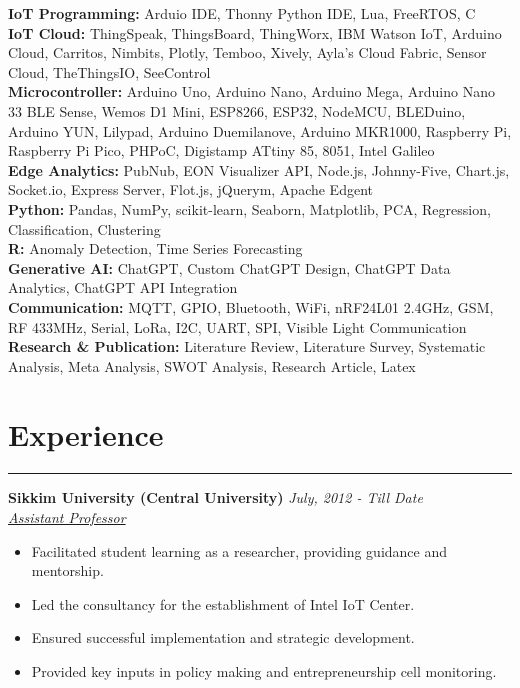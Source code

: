 \documentclass[10pt, a4paper]{article}
\begin{document}
	
		\textbf{IoT Programming:} Arduio IDE, Thonny Python IDE, Lua, FreeRTOS, C
	\\	
	\textbf{IoT Cloud:} ThingSpeak, ThingsBoard, ThingWorx, IBM Watson IoT, Arduino Cloud, Carritos, Nimbits, Plotly, Temboo, Xively, Ayla's Cloud Fabric, Sensor Cloud, TheThingsIO, SeeControl
	\\
	\textbf{Microcontroller:} Arduino Uno, Arduino Nano, Arduino Mega, Arduino Nano 33 BLE Sense, Wemos D1 Mini, ESP8266, ESP32, NodeMCU, BLEDuino, Arduino YUN, Lilypad, Arduino Duemilanove, Arduino MKR1000, Raspberry Pi, Raspberry Pi Pico, PHPoC, Digistamp ATtiny 85, 8051, Intel Galileo \\
		\textbf{Edge Analytics:} PubNub, EON Visualizer API, Node.js, Johnny-Five, Chart.js, Socket.io, Express Server, Flot.js, jQuerym, Apache Edgent
		\\
		\textbf{Python:} Pandas, NumPy, scikit-learn, Seaborn, Matplotlib, PCA, Regression, Classification, Clustering
		\\
		\textbf{R:} Anomaly Detection, Time Series Forecasting
		\\	
		\textbf{Generative AI:} ChatGPT, Custom ChatGPT Design, ChatGPT Data Analytics, ChatGPT API Integration
		\\    	
		\textbf{Communication:} MQTT, GPIO, Bluetooth, WiFi, nRF24L01 2.4GHz, GSM, RF 433MHz, Serial, LoRa, I2C, UART, SPI, Visible Light Communication 
		\\
		\textbf{Research \& Publication:} Literature Review, Literature Survey, Systematic Analysis, Meta Analysis, SWOT Analysis, Research Article, Latex 

    
		\vspace*{-3mm}
		
	
\section*{Experience}
\vspace*{-2.5mm}
\hrule 
\vspace*{2mm}
  \noindent\textbf{Sikkim University (Central University)} \hfill \textit{July, 2012 - Till Date}\\
  \textit{\underline{Assistant Professor}} \\
  \vspace*{-4mm}
    \begin{itemize}[leftmargin=*]
	\item Facilitated student learning as a researcher, providing guidance and mentorship.
	    \vspace*{-2.5mm}
	\item Led the consultancy for the establishment of Intel IoT Center. 
	\vspace*{-2.5mm}
	\item Ensured successful implementation and strategic development.
	    \vspace*{-2.5mm}
	\item Provided key inputs in policy making and entrepreneurship cell monitoring.  
	\end{itemize}
\end{document}
